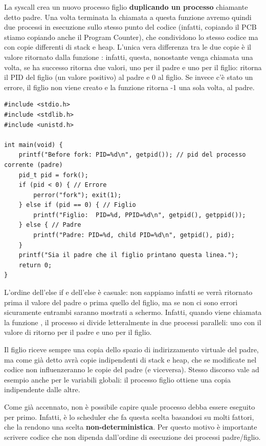 \documentclass[11pt, a4paper, titlepage, oneside]{scrbook}
\begin{document}
\begin{Definizione}
\label{def-fork}
La syscall  crea un nuovo processo figlio \textbf{duplicando un processo} chiamante detto padre. Una volta terminata la chiamata a questa funzione avremo quindi due processi in esecuzione sullo stesso punto del codice (infatti, copiando il PCB stiamo copiando anche il Program Counter), che condividono lo stesso codice ma con copie differenti di stack e heap. L'unica vera differenza tra le due copie è il valore ritornato dalla funzione : infatti, questa, nonostante venga chiamata una volta, se ha successo ritorna due valori, uno per il padre e uno per il figlio: ritorna il PID del figlio (un valore positivo) al padre e 0 al figlio. Se invece c'è stato un errore, il figlio non viene creato e la funzione ritorna -1 una sola volta, al padre.
\end{Definizione}

\begin{lstlisting}[style=C]
#include <stdio.h>
#include <stdlib.h>
#include <unistd.h>

int main(void) {
    printf("Before fork: PID=%d\n", getpid()); // pid del processo corrente (padre)
    pid_t pid = fork();
    if (pid < 0) { // Errore
        perror("fork"); exit(1);
    } else if (pid == 0) { // Figlio
        printf("Figlio:  PID=%d, PPID=%d\n", getpid(), getppid());
    } else { // Padre
        printf("Padre: PID=%d, child PID=%d\n", getpid(), pid);
    }
    printf("Sia il padre che il figlio printano questa linea.");
    return 0;
}
\end{lstlisting}

L'ordine dell'else if e dell'else è casuale: non sappiamo infatti se verrà ritornato prima il valore del padre o prima quello del figlio, ma se non ci sono errori sicuramente entrambi saranno mostrati a schermo. Infatti, quando viene chiamata la funzione , il processo si divide letteralmente in due processi paralleli: uno con il valore di ritorno per il padre e uno per il figlio.

Il figlio riceve sempre una copia dello spazio di indirizzamento virtuale del padre, ma come già detto avrà copie indipendenti di stack e heap, che se modificate nel codice non influenzeranno le copie del padre (e viceversa). Stesso discorso vale ad esempio anche per le variabili globali: il processo figlio ottiene una copia indipendente dalle altre.

\begin{Proposizione}
\label{propos-chi-va-prima}
Come già accennato, non è possibile capire quale processo debba essere eseguito per primo. Infatti, è lo scheduler che fa questa scelta basandosi su molti fattori, che la rendono una scelta \textbf{non-deterministica}. Per questo motivo è importante scrivere codice che non dipenda dall'ordine di esecuzione dei processi padre/figlio.
\end{Proposizione}
\end{document}
